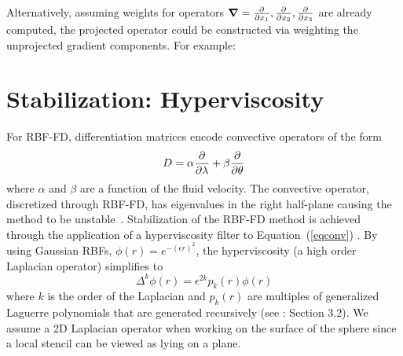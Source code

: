 \documentclass{report}
\begin{document}
{Alternatively, assuming weights for operators $\mbox{\boldmath$ \nabla $} = \frac{\partial }{\partial x_{1}}, \frac{\partial }{\partial x_{2}}, \frac{\partial }{\partial x_{3}}$ are already computed, the projected operator could be constructed via weighting the unprojected gradient components. For example: 



\section{Stabilization: Hyperviscosity}

For RBF-FD, differentiation matrices encode convective operators of the form 
\begin{equation}
D = \alpha \frac{\partial }{\partial \lambda} + \beta \frac{\partial }{\partial \theta} \label{eqconv}
\end{equation}
where $\alpha$ and $\beta$ are a function of the fluid velocity. The convective operator, discretized
through RBF-FD, has eigenvalues 
 in the right half-plane causing the method to be unstable~\cite{FornbergLehto11, FlyerLehto11}. 
Stabilization of the RBF-FD method is achieved through the application of a hyperviscosity filter 
to Equation~(\ref{eqconv}) \cite{FornbergLehto11}. By using Gaussian 
 RBFs, $\phi(r) = e^{-(\epsilon r)^2}$, the hyperviscosity (a high order Laplacian operator) simplifies to
\begin{equation}
\Delta^{k}\phi(r) = \epsilon^{2k} p_k(r) \phi(r)
\label{eqn:gaussian_hv}
\end{equation}
where $k$ is the order of the Laplacian and  $p_k(r)$ are multiples of generalized Laguerre polynomials that
are generated recursively (see \cite{FornbergLehto11}: Section 3.2). We assume a 2D  Laplacian operator 
when working on the surface of the sphere since a local stencil can be viewed as lying on a plane.

}
\end{document}
